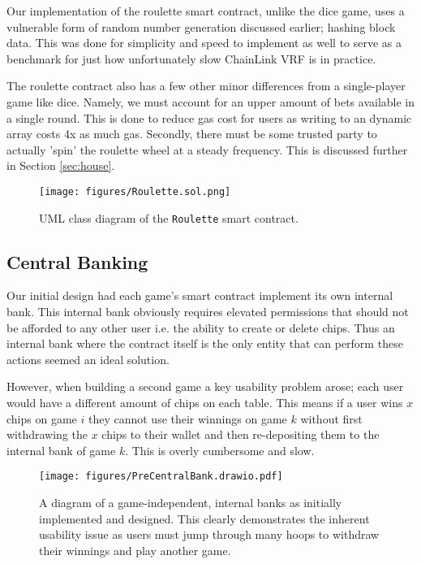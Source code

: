 \documentclass[10pt,journal,compsoc]{IEEEtran}
\begin{document}
Our implementation of the roulette smart contract, unlike the dice game, uses a vulnerable form of random number generation discussed earlier; hashing block data. This was done for simplicity and speed to implement as well to serve as a benchmark for just how unfortunately slow ChainLink VRF is in practice.

The roulette contract also has a few other minor differences from a single-player game like dice. Namely, we must account for an upper amount of bets available in a single round. This is done to reduce gas cost for users as writing to an dynamic array costs 4x as much gas. Secondly, there must be some trusted party to actually 'spin' the roulette wheel at a steady frequency. This is discussed further in Section \ref{sec:house}.

\begin{figure}[!h]
    \centering
    \texttt{[image: figures/Roulette.sol.png]}
    \caption{UML class diagram of the \texttt{Roulette} smart contract.}
    \label{fig:rouletteuml}
\end{figure}

\subsection{Central Banking}
\label{sec:bank}
Our initial design had each game's smart contract implement its own internal bank. This internal bank obviously requires elevated permissions that should not be afforded to any other user i.e. the ability to create or delete chips. Thus an internal bank where the contract itself is the only entity that can perform these actions seemed an ideal solution.

However, when building a second game a key usability problem arose; each user would have a different amount of chips on each table. This means if a user wins $x$ chips on game $i$ they cannot use their winnings on game $k$ without first withdrawing the $x$ chips to their wallet and then re-depositing them to the internal bank of game $k$. This is overly cumbersome and slow.

\begin{figure}[!h]
    \centering
    \texttt{[image: figures/PreCentralBank.drawio.pdf]}
    \caption{A diagram of a game-independent, internal banks as initially implemented and designed. This clearly demonstrates the inherent usability issue as users must jump through many hoops to withdraw their winnings and play another game.}
    \label{fig:precentralbank}
\end{figure}
\end{document}
